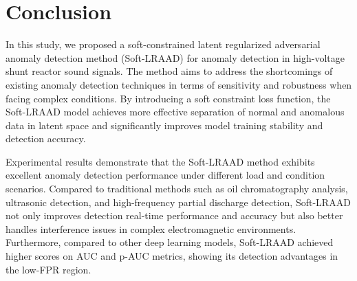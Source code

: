 \documentclass{article}
\begin{document}
\section{Conclusion}

In this study, we proposed a soft-constrained latent regularized adversarial anomaly detection method (Soft-LRAAD) for anomaly detection in high-voltage shunt reactor sound signals. The method aims to address the shortcomings of existing anomaly detection techniques in terms of sensitivity and robustness when facing complex conditions. By introducing a soft constraint loss function, the Soft-LRAAD model achieves more effective separation of normal and anomalous data in latent space and significantly improves model training stability and detection accuracy.

Experimental results demonstrate that the Soft-LRAAD method exhibits excellent anomaly detection performance under different load and condition scenarios. Compared to traditional methods such as oil chromatography analysis, ultrasonic detection, and high-frequency partial discharge detection, Soft-LRAAD not only improves detection real-time performance and accuracy but also better handles interference issues in complex electromagnetic environments. Furthermore, compared to other deep learning models, Soft-LRAAD achieved higher scores on AUC and p-AUC metrics, showing its detection advantages in the low-FPR region.


\end{document}

